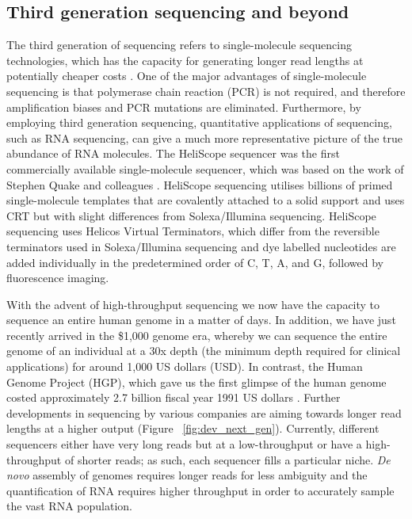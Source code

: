 \subsection{Third generation sequencing and beyond}

The third generation of sequencing refers to single-molecule sequencing technologies, which has the capacity for generating longer read lengths at potentially cheaper costs \citep{pmid20858600}. One of the major advantages of single-molecule sequencing is that polymerase chain reaction (PCR) is not required, and therefore amplification biases and PCR mutations are eliminated. Furthermore, by employing third generation sequencing, quantitative applications of sequencing, such as RNA sequencing, can give a much more representative picture of the true abundance of RNA molecules. The HeliScope sequencer was the first commercially available single-molecule sequencer, which was based on the work of Stephen Quake and colleagues \citep{pmid12651960}. HeliScope sequencing utilises billions of primed single-molecule templates that are covalently attached to a solid support and uses CRT but with slight differences from Solexa/Illumina sequencing. HeliScope sequencing uses Helicos Virtual Terminators, which differ from the reversible terminators used in Solexa/Illumina sequencing and dye labelled nucleotides are added individually in the predetermined order of C, T, A, and G, followed by fluorescence imaging.

With the advent of high-throughput sequencing we now have the capacity to sequence an entire human genome in a matter of days. In addition, we have just recently arrived in the \$1,000 genome era, whereby we can sequence the entire genome of an individual at a 30x depth (the minimum depth required for clinical applications) for around 1,000 US dollars (USD). In contrast, the Human Genome Project (HGP), which gave us the first glimpse of the human genome \citep{lander2001initial} costed approximately 2.7 billion fiscal year 1991 US dollars \citep{nhgri2010cost}. Further developments in sequencing by various companies are aiming towards longer read lengths at a higher output (Figure ~\ref{fig:dev_next_gen}). Currently, different sequencers either have very long reads but at a low-throughput or have a high-throughput of shorter reads; as such, each sequencer fills a particular niche. \textit{De novo} assembly of genomes requires longer reads for less ambiguity and the quantification of RNA requires higher throughput in order to accurately sample the vast RNA population.


